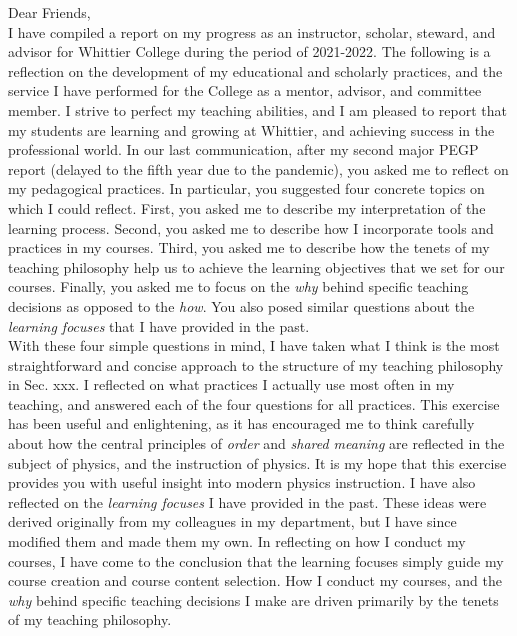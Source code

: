 \documentclass[../../main.tex]{subfiles}
\begin{document}
Dear Friends,
\\
\vspace{0.15cm}
I have compiled a report on my progress as an instructor, scholar, steward, and advisor for Whittier College during the period of 2021-2022.  The following is a reflection on the development of my educational and scholarly practices, and the service I have performed for the College as a mentor, advisor, and committee member. I strive to perfect my teaching abilities, and I am pleased to report that my students are learning and growing at Whittier, and achieving success in the professional world.  In our last communication, after my second major PEGP report (delayed to the fifth year due to the pandemic), you asked me to reflect on my pedagogical practices.  In particular, you suggested four concrete topics on which I could reflect.  First, you asked me to describe my interpretation of the learning process.  Second, you asked me to describe how I incorporate tools and practices in my courses.  Third, you asked me to describe how the tenets of my teaching philosophy help us to achieve the learning objectives that we set for our courses.  Finally, you asked me to focus on the \textit{why} behind specific teaching decisions as opposed to the \textit{how}.  You also posed similar questions about the \textit{learning focuses} that I have provided in the past.
\\
\vspace{0.25cm}
With these four simple questions in mind, I have taken what I think is the most straightforward and concise approach to the structure of my teaching philosophy in Sec. xxx.  I reflected on what practices I actually use most often in my teaching, and answered each of the four questions for all practices.  This exercise has been useful and enlightening, as it has encouraged me to think carefully about how the central principles of \textit{order} and \textit{shared meaning} are reflected in the subject of physics, and the instruction of physics.  It is my hope that this exercise provides you with useful insight into modern physics instruction.  I have also reflected on the \textit{learning focuses} I have provided in the past.  These ideas were derived originally from my colleagues in my department, but I have since modified them and made them my own.  In reflecting on how I conduct my courses, I have come to the conclusion that the learning focuses simply guide my course creation and course content selection.  How I conduct my courses, and the \textit{why} behind specific teaching decisions I make are driven primarily by the tenets of my teaching philosophy.
\end{document}
